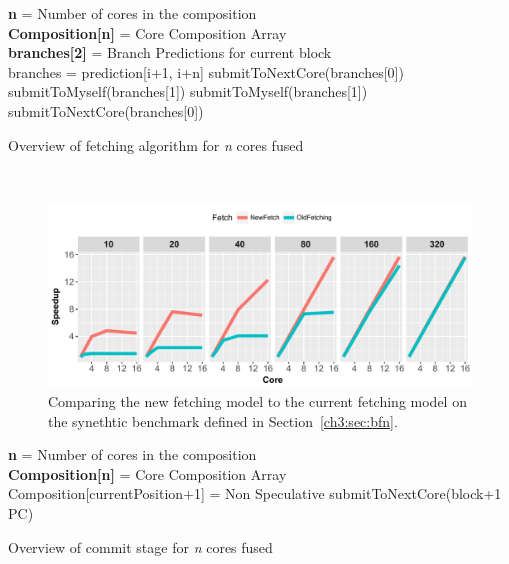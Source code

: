 \begin{algorithm}

\textbf{n} = Number of cores in the composition\\
\textbf{Composition[n]} = Core Composition Array\\
\textbf{branches[2]} = Branch Predictions for current block\\

{
{
	branches = prediction[i+1, i+n]
}
{
	{
		submitToNextCore(branches[0])\\
		submitToMyself(branches[1])
	}
	{
		submitToMyself(branches[1])\\
	}
}
{
	{
		submitToNextCore(branches[0])\\
	}
}	
}
\caption{Overview of fetching algorithm for \textit{n} cores fused}~\label{alg:fetch}
\end{algorithm}

\begin{figure}[t]
    \centering
    \includegraphics[width=1\textwidth]{chapter3/graphics/new_vs_old_synthetic.pdf}
    \caption{Comparing the new fetching model to the current fetching model on the synethtic benchmark defined in Section~\ref{ch3:sec:bfn}.}
    \label{fig:synthetic_ex}
\end{figure}


\begin{algorithm}
\textbf{n} = Number of cores in the composition\\
\textbf{Composition[n]} = Core Composition Array\\

{
	{
		Composition[currentPosition+1] = Non Speculative\;
	}
	{
		submitToNextCore(block+1 PC)
	}
}

\caption{Overview of commit stage for \textit{n} cores fused}~\label{alg:commit}
\end{algorithm}

